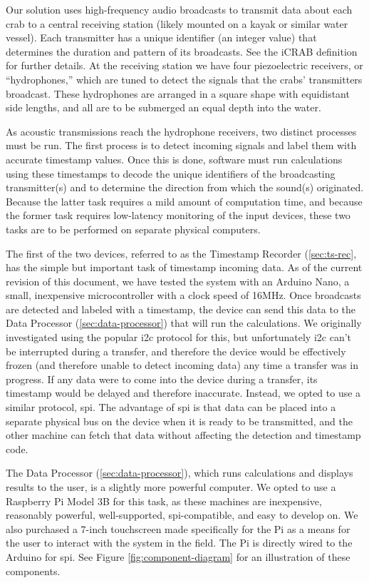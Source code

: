 \documentclass[12pt]{article}
\begin{document}
Our solution uses high-frequency audio broadcasts to transmit data about
each crab to a central receiving station (likely mounted on a kayak or similar
water vessel).
Each transmitter has a unique identifier (an integer value) that determines
the duration and pattern of its broadcasts.
See the \gls{iCRAB} definition for further details.
At the receiving station we have four piezoelectric receivers, or
``hydrophones,'' which are tuned to detect the signals that the crabs'
transmitters broadcast.
These hydrophones are arranged in a square shape with equidistant side
lengths, and all are to be submerged an equal depth into the water.

As acoustic transmissions reach the hydrophone receivers, two distinct
processes must be run.
The first process is to detect incoming signals and label them with accurate
timestamp values.
Once this is done, software must run calculations using these timestamps
to decode the unique identifiers of the broadcasting transmitter(s) and to
determine the direction from which the sound(s) originated.
Because the latter task requires a mild amount of computation time,
and because the former task requires low-latency monitoring of the input
devices, these two tasks are to be performed on separate physical computers.

The first of the two devices, referred to as the Timestamp Recorder
(\ref{sec:ts-rec},
has the simple but important task of timestamp incoming data.
As of the current revision of this document,
we have tested the system with an Arduino Nano, a small,
inexpensive microcontroller with a clock speed of 16MHz.
Once broadcasts are detected and labeled with a timestamp, the device can
send this data to the Data Processor (\ref{sec:data-processor})
that will run the calculations.
We originally investigated using the popular \gls{i2c} protocol for this, but
unfortunately \gls{i2c} can't be interrupted during a transfer, and therefore
the device would be effectively frozen (and therefore unable to detect
incoming data) any time a transfer was in progress.
If any data were to come into the device during a transfer, its timestamp
would be delayed and therefore inaccurate.
Instead, we opted to use a similar protocol, \gls{spi}.
The advantage of \gls{spi} is that data can be placed into a separate physical
bus on the device when it is ready to be transmitted, and the other machine can
fetch that data without affecting the detection and timestamp code.

The Data Processor (\ref{sec:data-processor}),
which runs calculations and displays results to the user,
is a slightly more powerful computer.
We opted to use a Raspberry Pi Model 3B for this task, as these machines are
inexpensive, reasonably powerful, well-supported, \gls{spi}-compatible,
and easy to develop on.
We also purchased a 7-inch touchscreen made specifically for the Pi as a means
for the user to interact with the system in the field.
The Pi is directly wired to the Arduino for \gls{spi}.
See Figure \ref{fig:component-diagram} for an illustration of these components.
\end{document}
